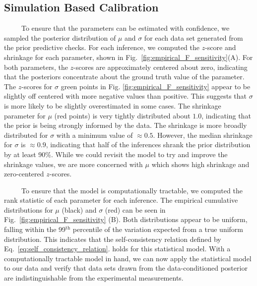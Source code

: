 \documentclass[12pt]{caltech_thesis}
\begin{document}
\hypertarget{simulation-based-calibration}{%
\subsection{Simulation Based
Calibration}\label{simulation-based-calibration}}

~~~~~To ensure that the parameters can be estimated with confidence, we
sampled the posterior distribution of \(\mu\) and \(\sigma\) for each
data set generated from the prior predictive checks. For each inference,
we computed the \(z\)-score and shrinkage for each parameter, shown in
Fig.~\ref{fig:empirical_F_sensitivity}(A). For both parameters, the
\(z\)-scores are approximately centered about zero, indicating that the
posteriors concentrate about the ground truth value of the parameter.
The \(z\)-scores for \(\sigma\) green points in Fig.
\ref{fig:empirical_F_sensitivity} appear to be slightly off centered
with more negative values than positive. This suggests that \(\sigma\)
is more likely to be slightly overestimated in some cases. The shrinkage
parameter for \(\mu\) (red points) is very tightly distributed about
\(1.0\), indicating that the prior is being strongly informed by the
data. The shrinkage is more broadly distributed for \(\sigma\) with a
minimum value of \(\approx 0.5\). However, the median shrinkage for
\(\sigma\) is \(\approx 0.9\), indicating that half of the inferences
shrank the prior distribution by at least 90\%. While we could revisit
the model to try and improve the shrinkage values, we are more concerned
with \(\mu\) which shows high shrinkage and zero-centered \(z\)-scores.

~~~~~To ensure that the model is computationally tractable, we computed
the rank statistic of each parameter for each inference. The empirical
cumulative distributions for \(\mu\) (black) and \(\sigma\) (red) can be
seen in Fig.~\ref{fig:empirical_F_sensitivity} (B). Both distributions
appear to be uniform, falling within the 99\(^\text{th}\) percentile of
the variation expected from a true uniform distribution. This indicates
that the self-consistency relation defined by
Eq.~\ref{eq:self_consistency_relation}. holds for this statistical
model. With a computationally tractable model in hand, we can now apply
the statistical model to our data and verify that data sets drawn from
the data-conditioned posterior are indistinguishable from the
experimental measurements.
\end{document}
